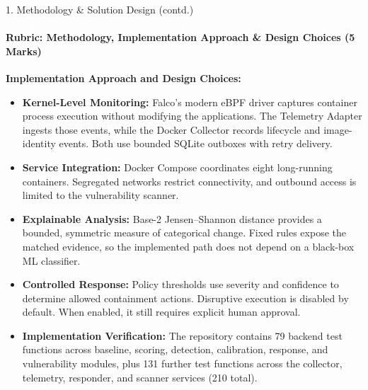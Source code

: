\documentclass[aspectratio=169, 11pt]{beamer}
\begin{document}
\begin{frame}{1. Methodology \& Solution Design (contd.)}
    \framesubtitle{Rubric: Methodology, Implementation Approach \& Design Choices (5 Marks)}

    \footnotesize
    \textbf{Implementation Approach and Design Choices:}

    \begin{itemize}
        \setlength{\itemsep}{7pt}

        \item \textbf{Kernel-Level Monitoring:}
        Falco's modern eBPF driver captures container process execution without
        modifying the applications. The Telemetry Adapter ingests those events,
        while the Docker Collector records lifecycle and image-identity events.
        Both use bounded SQLite outboxes with retry delivery.

        \item \textbf{Service Integration:}
        Docker Compose coordinates eight long-running containers. Segregated
        networks restrict connectivity, and outbound access is limited to the
        vulnerability scanner.

        \item \textbf{Explainable Analysis:}
        Base-2 Jensen--Shannon distance provides a bounded, symmetric measure of
        categorical change. Fixed rules expose the matched evidence, so the
        implemented path does not depend on a black-box ML classifier.

        \item \textbf{Controlled Response:}
        Policy thresholds use severity and confidence to determine allowed
        containment actions. Disruptive execution is disabled by default. When
        enabled, it still requires explicit human approval.

        \item \textbf{Implementation Verification:}
        The repository contains 79 backend test functions across baseline,
        scoring, detection, calibration, response, and vulnerability modules,
        plus 131 further test functions across the collector, telemetry,
        responder, and scanner services (210 total).
    \end{itemize}
\end{frame}
\end{document}
